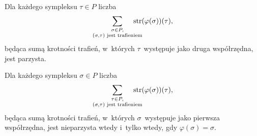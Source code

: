 \begin{lem}\label{lem-even_odd_krotonosci_hitow}\noindent
\begin{compactenum}[1)]
\item\label{evodd_krot_cz_1} Dla każdego sympleksu $\tau\in P$ liczba \[\sum_{\substack{\sigma\in P,\\(\sigma,\tau)\text{ jest trafieniem}}}\hspace{-0.5cm}\str(\varphi(\sigma))(\tau),\] będąca sumą krotności trafień, w~których $\tau$~występuje jako druga współrzędna, jest parzysta.

\item\label{evodd_krot_cz_2} Dla każdego sympleksu $\sigma\in P$ liczba \[\sum_{\substack{\tau\in P,\\(\sigma,\tau)\text{ jest trafieniem}}}\hspace{-0.5cm}\str(\varphi(\sigma))(\tau),\]
będąca sumą krotności trafień, w~których $\sigma$~występuje jako pierwsza współrzędna, jest nieparzysta wtedy i~tylko wtedy, gdy $\varphi(\sigma)=\sigma$.
\end{compactenum}
\end{lem}
